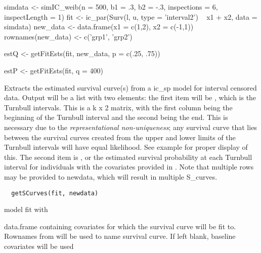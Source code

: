 \documentclass[a4paper]{book}
\begin{document}
%
\begin{Examples}
\begin{ExampleCode}
  simdata <- simIC_weib(n = 500, b1 = .3, b2 = -.3,
                        inspections = 6, inspectLength = 1)
  fit <- ic_par(Surv(l, u, type = 'interval2') ~ x1 + x2,
                data = simdata)
  new_data <- data.frame(x1 = c(1,2), x2 = c(-1,1))
  rownames(new_data) <- c('grp1', 'grp2')
  
  estQ <- getFitEsts(fit, new_data, p = c(.25, .75))
  
  estP <- getFitEsts(fit, q = 400)
\end{ExampleCode}
\end{Examples}
%
\begin{Description}\relax
Extracts the estimated survival curve(s) from a ic\_sp model for interval censored data. Output will be a list with two elements: the first item will be , which is the Turnbull intervals. This is a k x 2 matrix, with the first column being the beginning of the Turnbull interval and the second being the end. This is necessary due to the \emph{representational non-uniqueness}; any survival curve that lies between the survival curves created from the upper and lower limits of the Turnbull intervals will have equal likelihood. See example for proper display of this. The second item is , or the estimated survival probability at each Turnbull interval for individuals with the covariates provided in . Note that multiple rows may be provided to newdata, which will result in multiple S\_curves. 

\end{Description}
%
\begin{Usage}
\begin{verbatim}
  getSCurves(fit, newdata) 
\end{verbatim}
\end{Usage}
%
\begin{Arguments}
\begin{ldescription}
\item[\code{fit}] model fit with  
\item[\code{newdata}] data.frame containing covariates for which the survival curve will be fit to. Rownames from  will be used to name survival curve. If left blank, baseline covariates will be used
\end{ldescription}
\end{Arguments}
\end{document}
